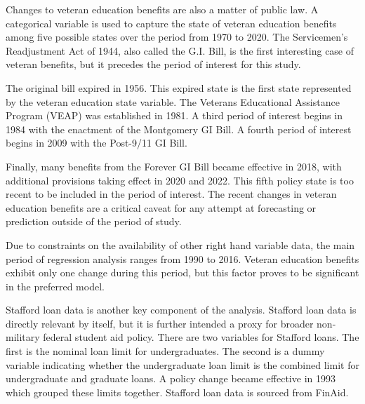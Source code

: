 \documentclass[review]{elsarticle}
\begin{document}
Changes to veteran education benefits are also a matter of public law.
A categorical variable is used to capture the state of veteran education benefits among five possible states over the period from 1970 to 2020.
The Servicemen's Readjustment Act of 1944,
also called the G.I. Bill,
is the first interesting case of veteran benefits,
but it precedes the period of interest for this study.

The original bill expired in 1956\cite{glass_2010}.
This expired state is the first state represented by the veteran education state variable.
The Veterans Educational Assistance Program (VEAP) was established in 1981\cite{veteransaffairs_2017}.
A third period of interest begins in 1984 with the enactment of the Montgomery GI Bill\cite{powers_2018}.
A fourth period of interest begins in 2009 with the Post-9/11 GI Bill.

Finally, many benefits from the Forever GI Bill became effective in 2018,
with additional provisions taking effect in 2020 and 2022\cite{veteransaffairs_2020}.
This fifth policy state is too recent to be included in the period of interest.
The recent changes in veteran education benefits are a critical caveat for any attempt at forecasting or prediction outside of the period of study.

Due to constraints on the availability of other right hand variable data,
the main period of regression analysis ranges from 1990 to 2016.
Veteran education benefits exhibit only one change during this period,
but this factor proves to be significant in the preferred model.
%

Stafford loan data is another key component of the analysis.
Stafford loan data is directly relevant by itself,
but it is further intended a proxy for broader non-military federal student aid policy.
There are two variables for Stafford loans.
The first is the nominal loan limit for undergraduates.
The second is a dummy variable indicating whether the undergraduate loan limit
is the combined limit for undergraduate and graduate loans.
A policy change became effective in 1993 which grouped these limits together.
Stafford loan data is sourced from FinAid\cite{finaid_2020}.
\end{document}
